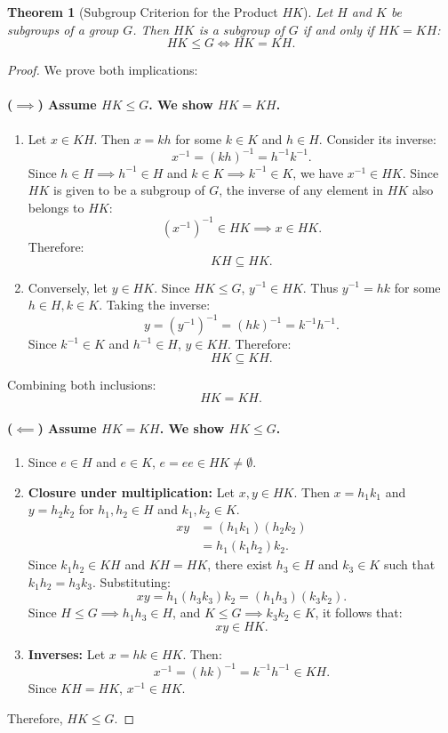 \documentclass[12pt]{article}
\theoremstyle{definition}
\theoremstyle{plain}
\newtheorem{theorem}{Theorem}[section]
\begin{document}
\begin{theorem}[Subgroup Criterion for the Product $HK$]
Let $H$ and $K$ be subgroups of a group $G$. Then $HK$ is a subgroup of $G$ if and only if $HK = KH$:
\[
HK \le G \iff HK = KH.
\]
\end{theorem}

\begin{proof}
We prove both implications:

\paragraph{($\implies$) Assume $HK \le G$. We show $HK = KH$.}
\begin{enumerate}
    \item Let $x \in KH$. Then $x = kh$ for some $k \in K$ and $h \in H$.
    Consider its inverse:
    \[
    x^{-1} = (kh)^{-1} = h^{-1} k^{-1}.
    \]
    Since $h \in H \implies h^{-1} \in H$ and $k \in K \implies k^{-1} \in K$, we have $x^{-1} \in HK$.
    Since $HK$ is given to be a subgroup of $G$, the inverse of any element in $HK$ also belongs to $HK$:
    \[
    (x^{-1})^{-1} \in HK \implies x \in HK.
    \]
    Therefore:
    \[
    KH \subseteq HK.
    \]
    
    \item Conversely, let $y \in HK$.
    Since $HK \le G$, $y^{-1} \in HK$.
    Thus $y^{-1} = hk$ for some $h \in H, k \in K$.
    Taking the inverse:
    \[
    y = (y^{-1})^{-1} = (hk)^{-1} = k^{-1} h^{-1}.
    \]
    Since $k^{-1} \in K$ and $h^{-1} \in H$, $y \in KH$.
    Therefore:
    \[
    HK \subseteq KH.
    \]
\end{enumerate}
Combining both inclusions:
\[
HK = KH.
\]

\paragraph{($\impliedby$) Assume $HK = KH$. We show $HK \le G$.}
\begin{enumerate}
    \item Since $e \in H$ and $e \in K$, $e = ee \in HK \neq \emptyset$.
    \item \textbf{Closure under multiplication:}
    Let $x, y \in HK$. Then $x = h_1 k_1$ and $y = h_2 k_2$ for $h_1, h_2 \in H$ and $k_1, k_2 \in K$.
    \begin{align*}
    xy &= (h_1 k_1)(h_2 k_2) \\
    &= h_1 (k_1 h_2) k_2.
    \end{align*}
    Since $k_1 h_2 \in KH$ and $KH = HK$, there exist $h_3 \in H$ and $k_3 \in K$ such that $k_1 h_2 = h_3 k_3$.
    Substituting:
    \[
    xy = h_1 (h_3 k_3) k_2 = (h_1 h_3)(k_3 k_2).
    \]
    Since $H \le G \implies h_1 h_3 \in H$, and $K \le G \implies k_3 k_2 \in K$, it follows that:
    \[
    xy \in HK.
    \]
    \item \textbf{Inverses:}
    Let $x = hk \in HK$. Then:
    \[
    x^{-1} = (hk)^{-1} = k^{-1} h^{-1} \in KH.
    \]
    Since $KH = HK$, $x^{-1} \in HK$.
\end{enumerate}
Therefore, $HK \le G$.
\end{proof}
\end{document}
